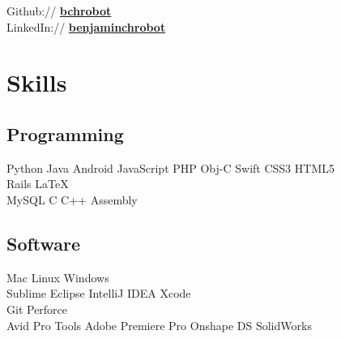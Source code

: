 \documentclass[letterpaper]{deedy-resume} %
\begin{document}
\begin{minipage}[t]{0.33\textwidth}
Github:// \href{https://github.com/bchrobot}{\bf bchrobot} \\
LinkedIn:// \href{https://www.linkedin.com/in/benjaminchrobot/}{\bf benjaminchrobot} \\

\sectionspace %


\section{Skills}


\subsection{Programming}

Python \textbullet{}
Java \textbullet{}
Android \textbullet{}
JavaScript \textbullet{}
PHP \textbullet{}
Obj-C \textbullet{}
Swift \textbullet{}
CSS3 \textbullet{}
HTML5 \\
Rails \textbullet{}
\LaTeX\ \\
MySQL \textbullet{}
C \textbullet{}
C++ \textbullet{}
Assembly \\

\sectionspace %

\subsection{Software}
Mac \textbullet{}
Linux \textbullet{}
Windows \\
Sublime \textbullet{}
Eclipse \textbullet{}
IntelliJ IDEA \textbullet{}
Xcode \\
Git \textbullet{}
Perforce \\
Avid Pro Tools \textbullet{}
Adobe Premiere Pro \textbullet{}
Onshape \textbullet{}
DS SolidWorks \\




\end{minipage}
\end{document}
